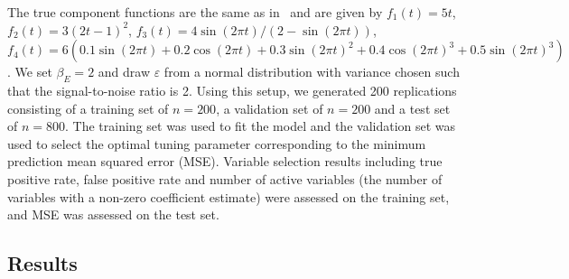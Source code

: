 \documentclass[useAMS,usenatbib,referee]{biom}
\begin{document}
The true component functions are the same as in~\citep{lin2006component,huang2010variable} and are given by $f_1(t) = 5t$, $f_2(t) = 3(2t-1)^2$, $f_3(t) = 4\sin(2\pi t) / (2-\sin(2\pi t))$, $f_4(t) = 6(0.1\sin(2\pi t) + 0.2 \cos(2\pi t)  + 0.3 \sin(2\pi t)^2 + 0.4\cos(2\pi t)^3+0.5\sin(2\pi t)^3)$. We set $\beta_E = 2$ and draw $\varepsilon$ from a normal distribution with variance chosen such that the signal-to-noise ratio is 2. Using this setup, we generated 200 replications consisting of a training set of $n=200$, a validation set of $n=200$ and a test set of $n=800$. The training set was used to fit the model and the validation set was used to select the optimal tuning parameter corresponding to the minimum prediction mean squared error (MSE). Variable selection results including true positive rate, false positive rate and number of active variables (the number of variables with a non-zero coefficient estimate) were assessed on the training set, and MSE was assessed on the test set. %

\subsection{Results}

%
%
%
\end{document}
